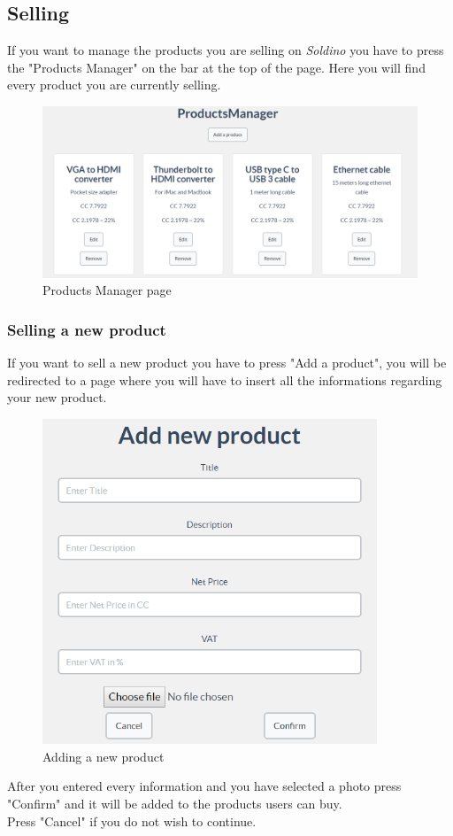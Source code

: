 	\subsection{Selling}
	If you want to manage the products you are selling on \textit{Soldino} you 
	have to press the "Products Manager" on the bar at the top of the page. 
	Here you will find every product you are currently selling.
	\begin{figure}[H]
		\includegraphics[width=15cm]{res/images/products_manager.png}
		\centering
		\caption{Products Manager page}
	\end{figure}
	\subsubsection{Selling a new product}
	If you want to sell a new product you have to press "Add a product", you 
	will be redirected to a page where you will have to insert all the 
	informations regarding your new product.
	\begin{figure}[H]
		\includegraphics[width=10cm]{res/images/add_new_product.png}
		\centering
		\caption{Adding a new product}
	\end{figure}
	\noindent After you entered every information and you have selected a photo press
	"Confirm" and it will be added to the products users can buy.
	\\Press "Cancel" if you do not wish to continue.
	
